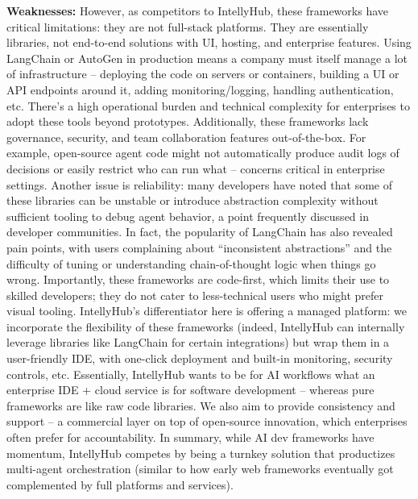 \documentclass[11pt, a4paper, oneside]{article}
\begin{document}
\textbf{Weaknesses:} However, as competitors to IntellyHub, these frameworks have critical limitations: they are not full-stack platforms. They are essentially libraries, not end-to-end solutions with UI, hosting, and enterprise features. Using LangChain or AutoGen in production means a company must itself manage a lot of infrastructure – deploying the code on servers or containers, building a UI or API endpoints around it, adding monitoring/logging, handling authentication, etc. There's a high operational burden and technical complexity for enterprises to adopt these tools beyond prototypes. Additionally, these frameworks lack governance, security, and team collaboration features out-of-the-box. For example, open-source agent code might not automatically produce audit logs of decisions or easily restrict who can run what – concerns critical in enterprise settings. Another issue is reliability: many developers have noted that some of these libraries can be unstable or introduce abstraction complexity without sufficient tooling to debug agent behavior, a point frequently discussed in developer communities\cite{langchainCritique}. In fact, the popularity of LangChain has also revealed pain points, with users complaining about “inconsistent abstractions” and the difficulty of tuning or understanding chain-of-thought logic when things go wrong. Importantly, these frameworks are code-first, which limits their use to skilled developers; they do not cater to less-technical users who might prefer visual tooling. IntellyHub's differentiator here is offering a managed platform: we incorporate the flexibility of these frameworks (indeed, IntellyHub can internally leverage libraries like LangChain for certain integrations) but wrap them in a user-friendly IDE, with one-click deployment and built-in monitoring, security controls, etc. Essentially, IntellyHub wants to be for AI workflows what an enterprise IDE + cloud service is for software development – whereas pure frameworks are like raw code libraries. We also aim to provide consistency and support – a commercial layer on top of open-source innovation, which enterprises often prefer for accountability. In summary, while AI dev frameworks have momentum, IntellyHub competes by being a turnkey solution that productizes multi-agent orchestration (similar to how early web frameworks eventually got complemented by full platforms and services).
\end{document}
